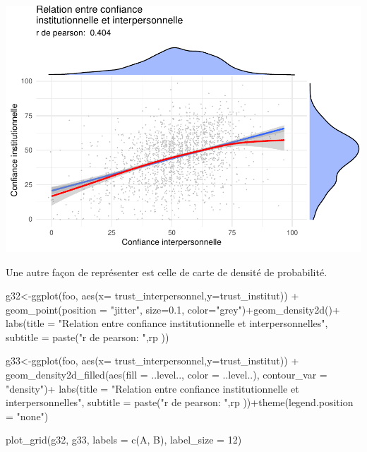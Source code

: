 \documentclass[
]{book}
\newenvironment{Shaded}{\begin{snugshade}}{\end{snugshade}}
\newcommand{\AttributeTok}[1]{\textcolor[rgb]{0.77,0.63,0.00}{#1}}
\newcommand{\DecValTok}[1]{\textcolor[rgb]{0.00,0.00,0.81}{#1}}
\newcommand{\FloatTok}[1]{\textcolor[rgb]{0.00,0.00,0.81}{#1}}
\newcommand{\FunctionTok}[1]{\textcolor[rgb]{0.00,0.00,0.00}{#1}}
\newcommand{\NormalTok}[1]{#1}
\newcommand{\OtherTok}[1]{\textcolor[rgb]{0.56,0.35,0.01}{#1}}
\newcommand{\SpecialCharTok}[1]{\textcolor[rgb]{0.00,0.00,0.00}{#1}}
\newcommand{\StringTok}[1]{\textcolor[rgb]{0.31,0.60,0.02}{#1}}
\begin{document}
\includegraphics{bookdown-demo_files/figure-latex/415-1.pdf}

Une autre façon de représenter est celle de carte de densité de probabilité.

\begin{Shaded}
\begin{Highlighting}[]
\NormalTok{g32}\OtherTok{\textless{}{-}}\FunctionTok{ggplot}\NormalTok{(foo, }\FunctionTok{aes}\NormalTok{(}\AttributeTok{x=}\NormalTok{ trust\_interpersonnel,}\AttributeTok{y=}\NormalTok{trust\_institut)) }\SpecialCharTok{+}
  \FunctionTok{geom\_point}\NormalTok{(}\AttributeTok{position =} \StringTok{"jitter"}\NormalTok{, }\AttributeTok{size=}\FloatTok{0.1}\NormalTok{, }\AttributeTok{color=}\StringTok{"grey"}\NormalTok{)}\SpecialCharTok{+}\FunctionTok{geom\_density2d}\NormalTok{()}\SpecialCharTok{+}
  \FunctionTok{labs}\NormalTok{(}\AttributeTok{title =} \StringTok{"Relation entre confiance institutionnelle et interpersonnelles"}\NormalTok{, }\AttributeTok{subtitle =} \FunctionTok{paste}\NormalTok{(}\StringTok{"r de pearson: "}\NormalTok{,rp ))}
  
\NormalTok{g33}\OtherTok{\textless{}{-}}\FunctionTok{ggplot}\NormalTok{(foo, }\FunctionTok{aes}\NormalTok{(}\AttributeTok{x=}\NormalTok{ trust\_interpersonnel,}\AttributeTok{y=}\NormalTok{trust\_institut)) }\SpecialCharTok{+}
  \FunctionTok{geom\_density2d\_filled}\NormalTok{(}\FunctionTok{aes}\NormalTok{(}\AttributeTok{fill =}\NormalTok{ ..level.., }\AttributeTok{color =}\NormalTok{ ..level..),}
    \AttributeTok{contour\_var =} \StringTok{"density"}\NormalTok{)}\SpecialCharTok{+}
  \FunctionTok{labs}\NormalTok{(}\AttributeTok{title =} \StringTok{"Relation entre confiance institutionnelle et interpersonnelles"}\NormalTok{, }\AttributeTok{subtitle =} \FunctionTok{paste}\NormalTok{(}\StringTok{"r de pearson: "}\NormalTok{,rp ))}\SpecialCharTok{+}\FunctionTok{theme}\NormalTok{(}\AttributeTok{legend.position =} \StringTok{"none"}\NormalTok{)}
  

\FunctionTok{plot\_grid}\NormalTok{(g32, g33, }\AttributeTok{labels =} \FunctionTok{c}\NormalTok{(}\StringTok{\textquotesingle{}A\textquotesingle{}}\NormalTok{, }\StringTok{\textquotesingle{}B\textquotesingle{}}\NormalTok{), }\AttributeTok{label\_size =} \DecValTok{12}\NormalTok{)}
\end{Highlighting}
\end{Shaded}
\end{document}
